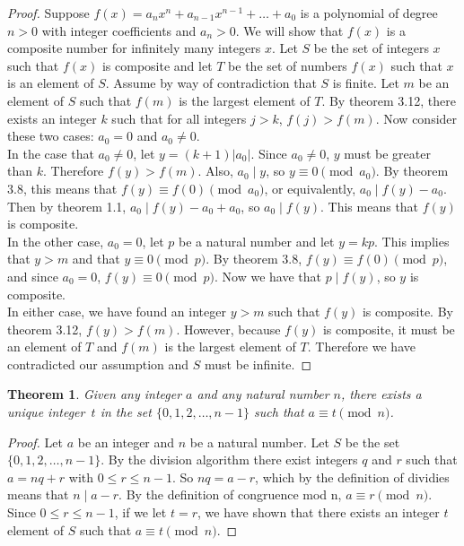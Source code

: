 \documentclass[12pt,leqno]{article}
\numberwithin{equation}{section}
\newtheorem{thm}{Theorem}[section]
\theoremstyle{definition}
\newcommand{\card}[1]{\left| #1 \right|}
\begin{document}
\begin{proof}[Proof]
Suppose $f(x) = a_nx^n + a_{n-1}x^{n-1} + \hdots + a_0$ is a polynomial of degree $n > 0$ with integer coefficients and $a_n > 0$.  We will show that $f(x)$ is a composite number for infinitely many integers $x$.  Let $S$ be the set of integers $x$ such that $f(x)$ is composite and let $T$ be the set of numbers $f(x)$ such that $x$ is an element of $S$.  Assume by way of contradiction that $S$ is finite.  Let $m$ be an element of $S$ such that $f(m)$ is the largest element of $T$.  By theorem 3.12, there exists an integer $k$ such that for all integers $j > k$, $f(j) > f(m)$.  Now consider these two cases: $a_0 = 0$ and $a_0 \neq 0$.\\
In the case that $a_0 \neq 0$, let $y = (k+1)\card{a_0}$.  Since $a_0 \neq 0$, $y$ must be greater than $k$.  Therefore $f(y) > f(m)$.  Also, $a_0 \mid y$, so $y \equiv 0 \pmod{a_0}$.  By theorem 3.8, this means that $f(y) \equiv f(0) \pmod{a_0}$, or equivalently, $a_0 \mid f(y) - a_0$.  Then by theorem 1.1, $a_0 \mid f(y) - a_0 + a_0$, so $a_0 \mid f(y)$.  This means that $f(y)$ is composite.\\
In the other case, $a_0 = 0$, let $p$ be a natural number and let $y = kp$.  This implies that $y > m$ and that $y \equiv 0 \pmod{p}$.  By theorem 3.8, $f(y) \equiv f(0) \pmod{p}$, and since $a_0 = 0$, $f(y) \equiv 0 \pmod{p}$.  Now we have that $p \mid f(y)$, so $y$ is composite.\\
In either case, we have found an integer $y > m$ such that $f(y)$ is composite.  By theorem 3.12, $f(y) > f(m)$.  However, because $f(y)$ is composite, it must be an element of $T$ and $f(m)$ is the largest element of $T$.  Therefore we have contradicted our assumption and $S$ must be infinite.
\end{proof}

\pagebreak
\begin{thm}Given any integer $a$ and any natural number $n$, there exists a unique integer~$t$ in the set $\{0, 1, 2, \hdots, n - 1\}$ such that $a \equiv t \pmod{n}$.
\end{thm}

\begin{proof}[Proof]
Let $a$ be an integer and $n$ be a natural number.  Let $S$ be the set $\{0, 1, 2, \hdots, n - 1\}$.  By the division algorithm there exist integers $q$ and $r$ such that $a = nq + r$ with $0 \leq r \leq n-1$.  So $nq = a - r$, which by the definition of dividies means that $n \mid a - r$.  By the definition of congruence mod n, $a \equiv r \pmod{n}$.  Since $0 \leq r \leq n-1$, if we let $t = r$, we have shown that there exists an integer $t$ element of $S$ such that $a \equiv t \pmod{n}$.
\end{proof}
\end{document}
